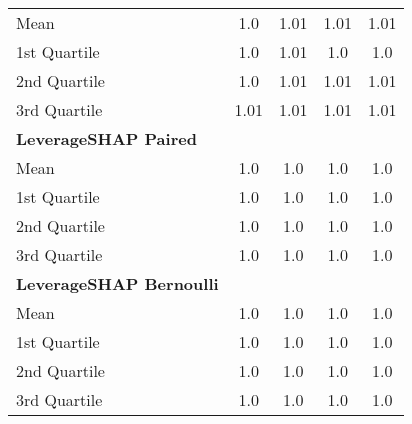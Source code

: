 {\begin{tabular} {lcccc}
\hspace{7pt}Mean & 1.0 & 1.01 & 1.01 & 1.01 \\ 
\hspace{7pt}1st Quartile & 1.0 & 1.01 & 1.0 & 1.0 \\ 
\hspace{7pt}2nd Quartile & 1.0 & 1.01 & 1.01 & 1.01 \\ 
\hspace{7pt}3rd Quartile & 1.01 & 1.01 & 1.01 & 1.01 \\ 
\addlinespace[1ex] 
\textbf{LeverageSHAP Paired} &  &  &  &  \\ 
\hspace{7pt}Mean & 1.0 & \cellcolor{bronze!60}1.0 & \cellcolor{bronze!60}1.0 & 1.0 \\ 
\hspace{7pt}1st Quartile & 1.0 & \cellcolor{bronze!60}1.0 & \cellcolor{silver!60}1.0 & 1.0 \\ 
\hspace{7pt}2nd Quartile & 1.0 & \cellcolor{bronze!60}1.0 & \cellcolor{bronze!60}1.0 & \cellcolor{bronze!60}1.0 \\ 
\hspace{7pt}3rd Quartile & 1.0 & \cellcolor{bronze!60}1.0 & \cellcolor{bronze!60}1.0 & \cellcolor{bronze!60}1.0 \\ 
\addlinespace[1ex] 
\textbf{LeverageSHAP Bernoulli} &  &  &  &  \\ 
\hspace{7pt}Mean & \cellcolor{gold!60}1.0 & \cellcolor{silver!60}1.0 & \cellcolor{gold!60}1.0 & \cellcolor{silver!60}1.0 \\ 
\hspace{7pt}1st Quartile & \cellcolor{gold!60}1.0 & \cellcolor{silver!60}1.0 & \cellcolor{gold!60}1.0 & \cellcolor{silver!60}1.0 \\ 
\hspace{7pt}2nd Quartile & \cellcolor{gold!60}1.0 & \cellcolor{gold!60}1.0 & \cellcolor{gold!60}1.0 & \cellcolor{silver!60}1.0 \\ 
\hspace{7pt}3rd Quartile & \cellcolor{silver!60}1.0 & \cellcolor{silver!60}1.0 & \cellcolor{gold!60}1.0 & \cellcolor{silver!60}1.0 \\ 
\bottomrule
\end{tabular}}